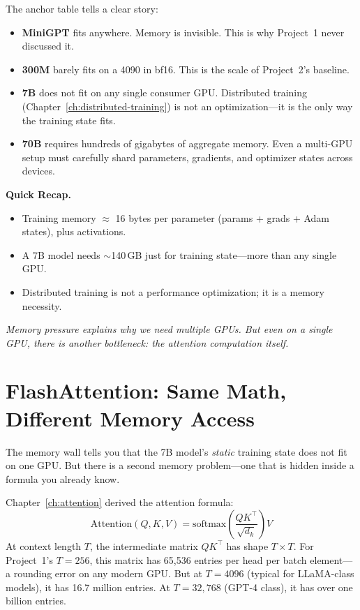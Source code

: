 The anchor table tells a clear story:

\begin{itemize}[nosep]
  \item \textbf{MiniGPT} fits anywhere. Memory is invisible. This is why Project~1 never discussed it.
  \item \textbf{300M} barely fits on a 4090 in bf16. This is the scale of Project~2's baseline.
  \item \textbf{7B} does not fit on any single consumer GPU. Distributed training (Chapter~\ref{ch:distributed-training}) is not an optimization---it is the only way the training state fits.
  \item \textbf{70B} requires hundreds of gigabytes of aggregate memory. Even a multi-GPU setup must carefully shard parameters, gradients, and optimizer states across devices.
\end{itemize}

\begin{quickrecap}
\textbf{Quick Recap.}
\begin{itemize}[nosep,leftmargin=1.5em]
  \item Training memory $\approx$ 16 bytes per parameter (params + grads + Adam states), plus activations.
  \item A 7B model needs $\sim$140\,GB just for training state---more than any single GPU.
  \item Distributed training is not a performance optimization; it is a memory necessity.
\end{itemize}
\textit{Memory pressure explains why we need multiple GPUs. But even on a single GPU, there is another bottleneck: the attention computation itself.}
\end{quickrecap}


\section{FlashAttention: Same Math, Different Memory Access}
\label{sec:flash-attention}

The memory wall tells you that the 7B model's \emph{static} training state does not fit on one GPU. But there is a second memory problem---one that is hidden inside a formula you already know.

Chapter~\ref{ch:attention} derived the attention formula:
\[
  \text{Attention}(Q, K, V) = \text{softmax}\!\left(\frac{QK^\top}{\sqrt{d_k}}\right) V
\]
At context length $T$, the intermediate matrix $QK^\top$ has shape $T \times T$. For Project~1's $T = 256$, this matrix has 65,536 entries per head per batch element---a rounding error on any modern GPU. But at $T = 4096$ (typical for LLaMA-class models), it has 16.7 million entries. At $T = 32{,}768$ (GPT-4 class), it has over one billion entries.

